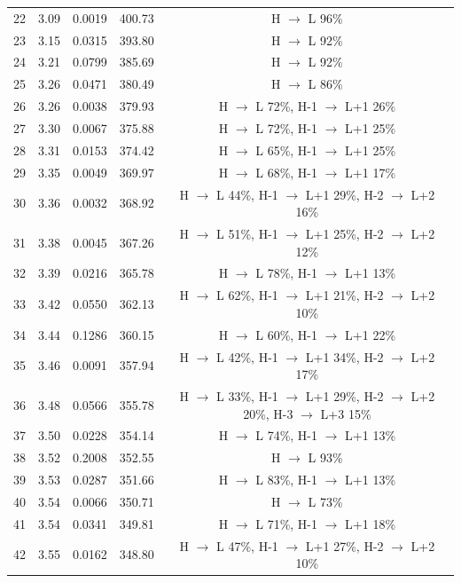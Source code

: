 \begin{table}[H]
{\begin{center}
\begin{tabular}{ccccc}
22 & 3.09 & 0.0019 & 400.73 & H $\rightarrow$ L 96\% \\
23 & 3.15 & 0.0315 & 393.80 & H $\rightarrow$ L 92\% \\
24 & 3.21 & 0.0799 & 385.69 & H $\rightarrow$ L 92\% \\
25 & 3.26 & 0.0471 & 380.49 & H $\rightarrow$ L 86\% \\
26 & 3.26 & 0.0038 & 379.93 & H $\rightarrow$ L 72\%, H-1 $\rightarrow$ L+1 26\% \\
27 & 3.30 & 0.0067 & 375.88 & H $\rightarrow$ L 72\%, H-1 $\rightarrow$ L+1 25\% \\
28 & 3.31 & 0.0153 & 374.42 & H $\rightarrow$ L 65\%, H-1 $\rightarrow$ L+1 25\% \\
29 & 3.35 & 0.0049 & 369.97 & H $\rightarrow$ L 68\%, H-1 $\rightarrow$ L+1 17\% \\
30 & 3.36 & 0.0032 & 368.92 & H $\rightarrow$ L 44\%, H-1 $\rightarrow$ L+1 29\%, H-2 $\rightarrow$ L+2 16\% \\
31 & 3.38 & 0.0045 & 367.26 & H $\rightarrow$ L 51\%, H-1 $\rightarrow$ L+1 25\%, H-2 $\rightarrow$ L+2 12\% \\
32 & 3.39 & 0.0216 & 365.78 & H $\rightarrow$ L 78\%, H-1 $\rightarrow$ L+1 13\% \\
33 & 3.42 & 0.0550 & 362.13 & H $\rightarrow$ L 62\%, H-1 $\rightarrow$ L+1 21\%, H-2 $\rightarrow$ L+2 10\% \\
34 & 3.44 & 0.1286 & 360.15 & H $\rightarrow$ L 60\%, H-1 $\rightarrow$ L+1 22\% \\
35 & 3.46 & 0.0091 & 357.94 & H $\rightarrow$ L 42\%, H-1 $\rightarrow$ L+1 34\%, H-2 $\rightarrow$ L+2 17\% \\
36 & 3.48 & 0.0566 & 355.78 & H $\rightarrow$ L 33\%, H-1 $\rightarrow$ L+1 29\%, H-2 $\rightarrow$ L+2 20\%, H-3 $\rightarrow$ L+3 15\% \\
37 & 3.50 & 0.0228 & 354.14 & H $\rightarrow$ L 74\%, H-1 $\rightarrow$ L+1 13\% \\
38 & 3.52 & 0.2008 & 352.55 & H $\rightarrow$ L 93\% \\
39 & 3.53 & 0.0287 & 351.66 & H $\rightarrow$ L 83\%, H-1 $\rightarrow$ L+1 13\% \\
40 & 3.54 & 0.0066 & 350.71 & H $\rightarrow$ L 73\% \\
41 & 3.54 & 0.0341 & 349.81 & H $\rightarrow$ L 71\%, H-1 $\rightarrow$ L+1 18\% \\
42 & 3.55 & 0.0162 & 348.80 & H $\rightarrow$ L 47\%, H-1 $\rightarrow$ L+1 27\%, H-2 $\rightarrow$ L+2 10\% \\

\end{tabular}
\end{center}}
\end{table}
